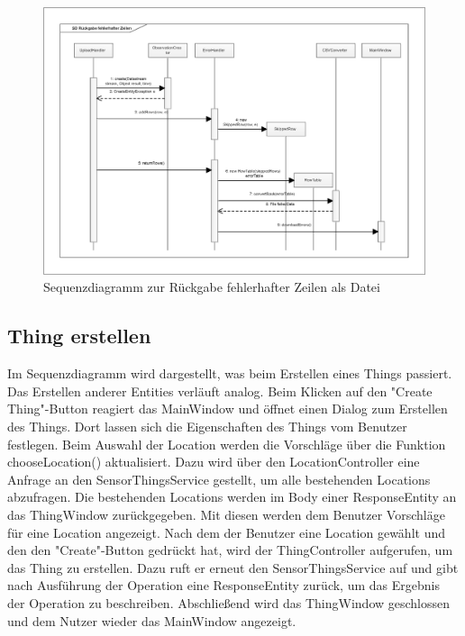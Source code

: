 \vspace{\fill}
\begin{figure}[htbp]
\centering
\includegraphics[scale=0.5]{uml/SD_returnErrors.eps}
\caption{Sequenzdiagramm zur Rückgabe fehlerhafter Zeilen als Datei}
\end{figure}
\vspace{\fill}

\clearpage
\subsection{Thing erstellen}

Im Sequenzdiagramm wird dargestellt, was beim Erstellen eines Things passiert.
Das Erstellen anderer Entities verläuft analog.
Beim Klicken auf den "{Create Thing}"{-Button} reagiert das MainWindow und öffnet einen Dialog zum Erstellen des Things.
Dort lassen sich die Eigenschaften des Things vom Benutzer festlegen.
Beim Auswahl der Location werden die Vorschläge über die Funktion chooseLocation() aktualisiert.
Dazu wird über den LocationController eine Anfrage an den SensorThingsService gestellt, um alle bestehenden Locations abzufragen.
Die bestehenden Locations werden im Body einer ResponseEntity an das ThingWindow zurückgegeben.
Mit diesen werden dem Benutzer Vorschläge für eine Location angezeigt.
Nach dem der Benutzer eine Location gewählt und den den "{Create}"{-Button} gedrückt hat, wird der ThingController aufgerufen, um das Thing zu erstellen.
Dazu ruft er erneut den SensorThingsService auf und gibt nach Ausführung der Operation eine ResponseEntity zurück, um das Ergebnis der Operation zu beschreiben.
Abschließend wird das ThingWindow geschlossen und dem Nutzer wieder das MainWindow angezeigt.

